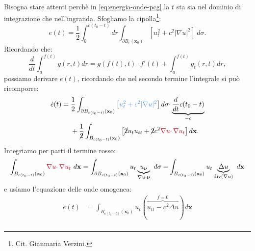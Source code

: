 \documentclass[10pt,a4paper,twoside,openright]{book}
\begin{document}
\begin{dimostrazione}
	Bisogna stare attenti perchè in \eqref{eq:energia-onde-pcg} la $t$ sta sia nel dominio di integrazione che nell'ingranda. Sfogliamo la cipolla\footnote{Cit. Gianmaria Verzini.}:
	\begin{equation*}
		e( t) =\frac{1}{2}\int _{0}^{c( t_{0} -t)} dr\int _{\partial B_{r}(\mathbf{x}_{0})}\left[ u_{t}^{2} +c^{2}| \nabla u| ^{2}\right] \ d\sigma .
	\end{equation*}
	Ricordando che:
	\begin{equation*}
		\frac{d}{dt}\int _{a}^{f( t)} g( r,t) dr=g( f( t),t) \cdotp f'( t) +\int _{a}^{f( t)} g_{t}( r,t) dr,
	\end{equation*}
	possiamo derivare $e( t)$, ricordando che nel secondo termine l'integrale si può ricomporre:
	\begin{align*}
		\dot{e}( t) & =\frac{1}{2}\int _{\partial B_{c( t_{0} -t)}(\mathbf{x}_{0})}\left[\textcolor[rgb]{0.29,0.56,0.89}{u_{t}^{2}+c^{2}| \nabla u| ^{2}}\right] d\sigma \cdotp \underbrace{\frac{d}{dt} c( t_{0} -t)}_{-c} \\
		            & \ \ \ \ +\frac{1}{\cancel{2}}\int _{B_{c( t_{0} -t)}(\mathbf{x}_{0})}\left[\cancel{2} u_{t} u_{tt} +\cancel{2} c^{2}\textcolor[rgb]{0.82,0.01,0.11}{\nabla u\cdotp \nabla u_{t}}\right] d\mathbf{x}.                                                                                                                                                                                                 
	\end{align*}
	Integriamo per parti il termine rosso:
	\begin{equation*}
		\int _{B_{c( t_{0} -t)}(\mathbf{x}_{0})}\textcolor[rgb]{0.82,0.01,0.11}{\nabla u\cdotp \nabla u_{t}} \ d\mathbf{x} =\int _{\partial B_{c( t_{0} -t)}(\mathbf{x}_{0})} u_{t}\underbrace{u_{\bm{\nu }}}_{\nabla u\cdotp \bm{\nu }} \ d\sigma -\int _{B_{c( t_{0} -t)}(\mathbf{x}_{0})} u_{t}\underbrace{\Delta u}_{\mathrm{div}( \nabla u)} \ d\mathbf{x}
	\end{equation*}
	e usiamo l'equazione delle onde omogenea:
	\begin{align*}
		\dot{e}( t) & =\int _{B_{c( t_{0} -t)}(\mathbf{x}_{0})} u_{t}(\overbrace{u_{tt} -c^{2} \Delta u}^{f=0}) d\mathbf{x}                                                                                                                                                                                                                                                                                                                                                                                       \\

\end{align*}
\end{dimostrazione}
\end{document}
